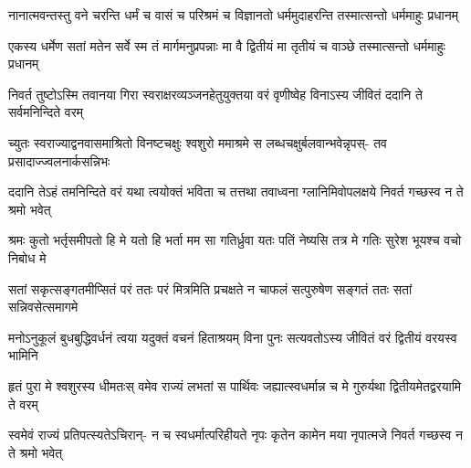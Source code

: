 \fourlineindentedshloka
{नानात्मवन्तस्तु वने चरन्ति}
{धर्मं च वासं च परिश्रमं च}
{विज्ञानतो धर्ममुदाहरन्ति}
{तस्मात्सन्तो धर्ममाहुः प्रधानम्}


\fourlineindentedshloka
{एकस्य धर्मेण सतां मतेन}
{सर्वे स्म तं मार्गमनुप्रपन्नाः}
{मा वै द्वितीयं मा तृतीयं च वाञ्छे}
{तस्मात्सन्तो धर्ममाहुः प्रधानम्}




\fourlineindentedshloka
{निवर्त तुष्टोऽस्मि तवानया गिरा}
{स्वराक्षरव्यञ्जनहेतुयुक्तया}
{वरं वृणीष्वेह विनाऽस्य जीवितं}
{ददानि ते सर्वमनिन्दिते वरम्}




\fourlineindentedshloka
{च्युतः स्वराज्याद्वनवासमाश्रितो}
{विनष्टचक्षुः श्वशुरो ममाश्रमे}
{स लब्धचक्षुर्बलवान्भवेन्नृपस्-}
{तव प्रसादाज्ज्वलनार्कसन्निभः}




\fourlineindentedshloka
{ददानि तेऽहं तमनिन्दिते वरं}
{यथा त्वयोक्तं भविता च तत्तथा}
{तवाध्वना ग्लानिमिवोपलक्षये}
{निवर्त गच्छस्व न ते श्रमो भवेत्}




\fourlineindentedshloka
{श्रमः कुतो भर्तृसमीपतो हि मे}
{यतो हि भर्ता मम सा गतिर्ध्रुवा}
{यतः पतिं नेष्यसि तत्र मे गतिः}
{सुरेश भूयश्च वचो निबोध मे}


\fourlineindentedshloka
{सतां सकृत्सङ्गतमीप्सितं परं}
{ततः परं मित्रमिति प्रचक्षते}
{न चाफलं सत्पुरुषेण सङ्गतं}
{ततः सतां सन्निवसेत्समागमे}




\fourlineindentedshloka
{मनोऽनुकूलं बुधबुद्धिवर्धनं}
{त्वया यदुक्तं वचनं हिताश्रयम्}
{विना पुनः सत्यवतोऽस्य जीवितं}
{वरं द्वितीयं वरयस्व भामिनि}




\fourlineindentedshloka
{हृतं पुरा मे श्वशुरस्य धीमतःस्}
{वमेव राज्यं लभतां स पार्थिवः}
{जह्यात्स्वधर्मान्न च मे गुरुर्यथा}
{द्वितीयमेतद्वरयामि ते वरम्}




\fourlineindentedshloka
{स्वमेवं राज्यं प्रतिपत्स्यतेऽचिरान्-}
{न च स्वधर्मात्परिहीयते नृपः}
{कृतेन कामेन मया नृपात्मजे}
{निवर्त गच्छस्व न ते श्रमो भवेत्}

